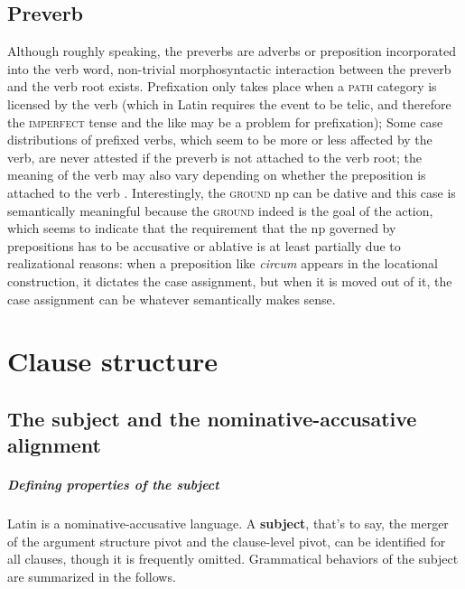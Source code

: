\documentclass[a4paper, oneside, 12pt]{report}
\newcommand*{\concept}[1]{\textbf{#1}}
\newcommand{\form}[1]{\emph{#1}}
\newcommand*{\category}[1]{\textsc{#1}}
\begin{document}
\section{Preverb}

Although roughly speaking, the preverbs are adverbs or preposition 
incorporated into the verb word, 
non-trivial morphosyntactic interaction between the preverb and the verb root exists.
Prefixation only takes place when a \category{path} category is licensed by the verb 
(which in Latin requires the event to be telic, 
and therefore the \category{imperfect} tense and the like may be a problem for prefixation);
Some case distributions of prefixed verbs,
which seem to be more or less affected by the verb, 
are never attested if the preverb is not attached to the verb root; 
the meaning of the verb may also vary depending on whether the preposition is attached to the verb 
\citep{mare2018issues}.
Interestingly, the \category{ground} \acs{np} can be dative 
and this case is semantically meaningful because the \category{ground} indeed is the goal of the action,
which seems to indicate that the requirement that 
the \acs{np} governed by prepositions has to be accusative or ablative
is at least partially due to realizational reasons: 
when a preposition like \form{circum} appears in the locational construction, 
it dictates the case assignment, 
but when it is moved out of it,
the case assignment can be whatever semantically makes sense.

\chapter{Clause structure}


\section{The subject and the nominative-accusative alignment}

\paragraph*{Defining properties of the subject} Latin is a nominative-accusative language.
A \concept{subject}, that's to say, the merger of 
the argument structure pivot and the clause-level pivot, 
can be identified for all clauses, 
though it is frequently omitted.
Grammatical behaviors of the subject are summarized in the follows.
\end{document}
